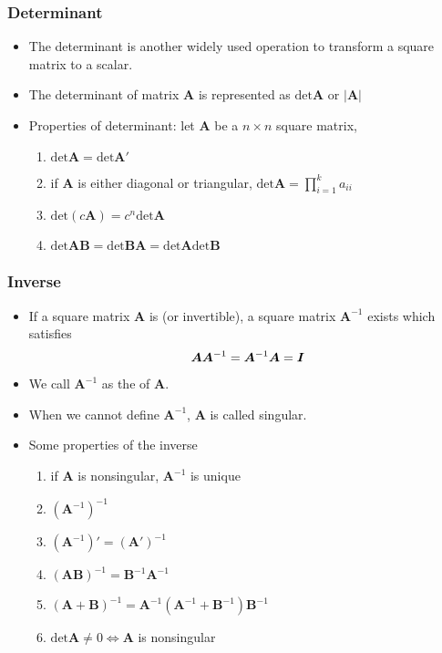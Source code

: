 \documentclass[pdflatex, 12pt]{beamer}
\begin{document}
\begin{frame}
\frametitle{Determinant}
\begin{itemize}
\item The determinant is another widely used operation	 to transform a square matrix to a scalar.
\vspace{0.4cm} 
\item The determinant of matrix $\bm{A}$ is represented as $\mathrm{det}\bm{A}$ or $|\bm{A}|$
\vspace{0.4cm}
\item Properties of determinant: let $\bm{A}$ be a $n \times n$ square matrix,
 \begin{enumerate}
 \item $\mathrm{det} \bm{A} = \mathrm{det} \bm{A}'$
 \item if $\bm{A}$ is either diagonal or triangular, $\mathrm{det} \bm{A} = \prod_{i = 1}^k a_{ii}$
 \item $\mathrm{det} (c\bm{A}) = c^n\mathrm{det} \bm{A}$
 \item $\mathrm{det} \bm{AB} = \mathrm{det} \bm{BA} = \mathrm{det} \bm{A}\mathrm{det} \bm{B}$
 \end{enumerate}
\end{itemize}
\end{frame}

\begin{frame}
\frametitle{Inverse}
\begin{itemize}
\item If a square matrix $\bm{A}$ is {\color{red}{nonsingular}} (or {\color{red}invertible}), a square matrix $\bm{A}^{-1}$ exists which satisfies
 \begin{equation}
 \bm{AA}^{-1} = \bm{A}^{-1}\bm{A} = \bm{I} \notag
 \end{equation}
\item We call $\bm{A}^{-1}$ as the {\color{red}{inverse}} of $\bm{A}$.
\vspace{0.4cm}
\item When we cannot define $\bm{A}^{-1}$, $\bm{A}$ is called singular.
\vspace{0.4cm}
\item Some properties of the inverse
 \begin{enumerate}
 \item if $\bm{A}$ is nonsingular, $\bm{A}^{-1}$ is unique
 \item $(\bm{A}^{-1})^{-1}$
 \item $(\bm{A}^{-1})' = (\bm{A}')^{-1}$
 \item $(\bm{AB})^{-1} = \bm{B}^{-1}\bm{A}^{-1}$ 
 \item $(\bm{A + B})^{-1} = \bm{A}^{-1}(\bm{A}^{-1} + \bm{B}^{-1})\bm{B}^{-1}$
 \item $\mathrm{det} \bm{A} \neq 0 \Leftrightarrow \bm{A}$ is nonsingular
 \end{enumerate}
\end{itemize}
\end{frame}
\end{document}
